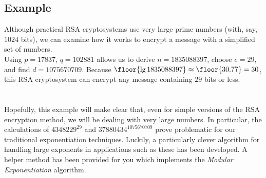 		\subsection{Example}
			Although practical RSA cryptosystems use very large prime numbers (with, say, $1024$ bits), we can examine how it works to encrypt a message with a simplified set of numbers.\\

			Using $p = 17837$, $q = 102881$ allows us to derive $n = 1835088397$, choose $e = 29$, and find $d = 1075670709$. Because $\floor{\lg 1835088397} \approx \floor{30.77} = 30$, this RSA cryptosystem can encrypt any message containing $29$ bits or less.\\[\baselineskip]
			\ \\[9pt]
			\ \\[\baselineskip]
			Hopefully, this example will make clear that, even for simple versions of the RSA encryption method, we will be dealing with very large numbers. In particular, the calculations of $4348229^{29}$ and $37880434^{1075670709}$ prove problematic for our traditional exponentiation techniques. Luckily, a particularly clever algorithm for handling large exponents in applications such as these has been developed. A helper method has been provided for you which implements the \emph{Modular Exponentiation} algorithm.

